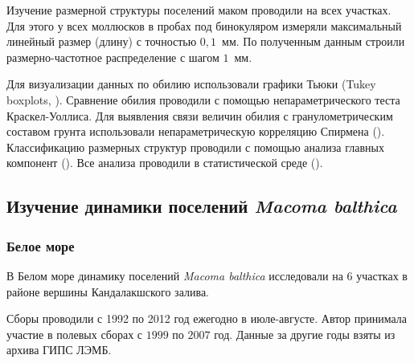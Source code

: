 Изучение размерной структуры поселений маком проводили на всех участках.
Для этого у всех моллюсков в пробах под бинокуляром измеряли максимальный линейный размер (длину) с точностью $0,1$~мм.
По полученным данным строили размерно-частотное распределение с шагом $1$~мм.


Для визуализации данных по обилию использовали графики Тьюки (Tukey boxplots, \cite{Tukey_1977}). 
Сравнение обилия проводили с помощью непараметрического теста Краскел-Уоллиса. 
Для выявления связи величин обилия с гранулометрическим составом грунта использовали непараметрическую корреляцию Спирмена (\cite{Hollander_et_al_2013}).
Классификацию размерных структур проводили с помощью анализа главных компонент (\cite{Mardia_et_al_1979}).
Все анализа проводили в статистической среде \R{} (\cite{R_2014}).

\afterpage{\clearpage}

	\subsection{Изучение динамики поселений {\it Macoma balthica}}
        \subsubsection{Белое море}
В Белом море динамику поселений {\it Macoma balthica} исследовали на $6$ участках в районе вершины Кандалакшского залива. 

Сборы проводили с 1992 по 2012 год ежегодно в июле-августе.
Автор принимала участие в полевых сборах с $1999$ по $2007$ год.
Данные за другие годы взяты из архива ГИПС ЛЭМБ.

